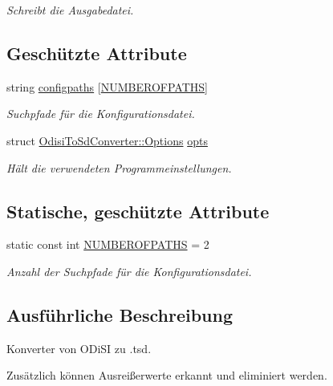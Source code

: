 \begin{DoxyCompactItemize}
\begin{DoxyCompactList}\small\item\em Schreibt die Ausgabedatei. \end{DoxyCompactList}\end{DoxyCompactItemize}
\subsection*{Geschützte Attribute}
\begin{DoxyCompactItemize}
\item 
string \hyperlink{classOdisiToSdConverter_aeecf67d22a4b6333ceabe5f1a1036736}{configpaths} \mbox{[}\hyperlink{classOdisiToSdConverter_a6f59f3670356c1588b736af33d59532a}{N\-U\-M\-B\-E\-R\-O\-F\-P\-A\-T\-H\-S}\mbox{]}
\begin{DoxyCompactList}\small\item\em Suchpfade für die Konfigurationsdatei. \end{DoxyCompactList}\item 
struct \hyperlink{structOdisiToSdConverter_1_1Options}{Odisi\-To\-Sd\-Converter\-::\-Options} \hyperlink{classOdisiToSdConverter_a032865606668d520887b2b164913539d}{opts}
\begin{DoxyCompactList}\small\item\em Hält die verwendeten Programmeinstellungen. \end{DoxyCompactList}\end{DoxyCompactItemize}
\subsection*{Statische, geschützte Attribute}
\begin{DoxyCompactItemize}
\item 
static const int \hyperlink{classOdisiToSdConverter_a6f59f3670356c1588b736af33d59532a}{N\-U\-M\-B\-E\-R\-O\-F\-P\-A\-T\-H\-S} = 2
\begin{DoxyCompactList}\small\item\em Anzahl der Suchpfade für die Konfigurationsdatei. \end{DoxyCompactList}\end{DoxyCompactItemize}


\subsection{Ausführliche Beschreibung}
Konverter von O\-Di\-S\-I zu .tsd. 

Zusätzlich können Ausreißerwerte erkannt und eliminiert werden. 

